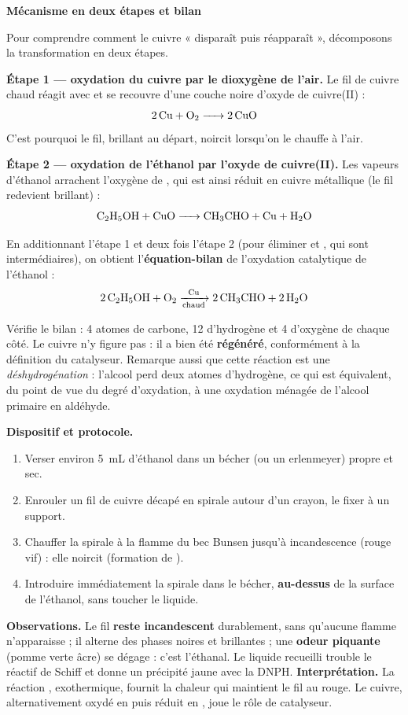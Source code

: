 \documentclass[11pt]{article}
\begin{document}
\textbf{Mécanisme en deux étapes et bilan}\par

Pour comprendre comment le cuivre « disparaît puis réapparaît », décomposons la transformation en deux étapes.

\textbf{Étape 1 — oxydation du cuivre par le dioxygène de l'air.} Le fil de cuivre chaud réagit avec  et se recouvre d'une couche noire d'oxyde de cuivre(II)  :
\[ \ce{2 Cu + O2 -> 2 CuO} \]
C'est pourquoi le fil, brillant au départ, noircit lorsqu'on le chauffe à l'air.

\textbf{Étape 2 — oxydation de l'éthanol par l'oxyde de cuivre(II).} Les vapeurs d'éthanol arrachent l'oxygène de , qui est ainsi réduit en cuivre métallique (le fil redevient brillant) :
\[ \ce{C2H5OH + CuO -> CH3CHO + Cu + H2O} \]

En additionnant l'étape 1 et deux fois l'étape 2 (pour éliminer  et , qui sont intermédiaires), on obtient l'\textbf{équation-bilan} de l'oxydation catalytique de l'éthanol :
\[ \ce{2 C2H5OH + O2 ->[Cu][chaud] 2 CH3CHO + 2 H2O} \]

Vérifie le bilan : 4 atomes de carbone, 12 d'hydrogène et 4 d'oxygène de chaque côté. Le cuivre n'y figure pas : il a bien été \textbf{régénéré}, conformément à la définition du catalyseur. Remarque aussi que cette réaction est une \emph{déshydrogénation} : l'alcool perd deux atomes d'hydrogène, ce qui est équivalent, du point de vue du degré d'oxydation, à une oxydation ménagée de l'alcool primaire en aldéhyde.

\begin{experience}
\textbf{Dispositif et protocole.}
\begin{enumerate}
\item Verser environ \SI{5}{mL} d'éthanol dans un bécher (ou un erlenmeyer) propre et sec.
\item Enrouler un fil de cuivre décapé en spirale autour d'un crayon, le fixer à un support.
\item Chauffer la spirale à la flamme du bec Bunsen jusqu'à incandescence (rouge vif) : elle noircit (formation de ).
\item Introduire immédiatement la spirale dans le bécher, \textbf{au-dessus} de la surface de l'éthanol, sans toucher le liquide.
\end{enumerate}
\textbf{Observations.} Le fil \textbf{reste incandescent} durablement, sans qu'aucune flamme n'apparaisse ; il alterne des phases noires et brillantes ; une \textbf{odeur piquante} (pomme verte âcre) se dégage : c'est l'éthanal. Le liquide recueilli trouble le réactif de Schiff et donne un précipité jaune avec la DNPH.
\textbf{Interprétation.} La réaction , exothermique, fournit la chaleur qui maintient le fil au rouge. Le cuivre, alternativement oxydé en  puis réduit en , joue le rôle de catalyseur.
\end{experience}
\end{document}

